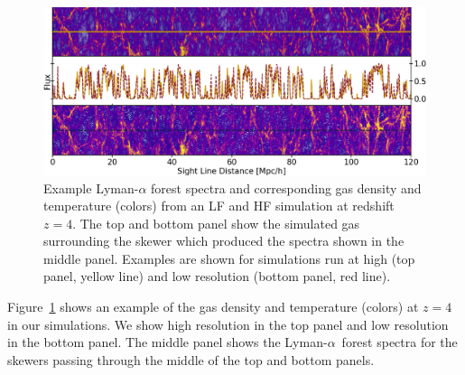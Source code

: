 \documentclass[a4paper,11pt]{article}
\newcommand{\lya}{Lyman-$\alpha$\ }
\begin{document}
\begin{figure}
    \centering
    \includegraphics[width=\columnwidth]{figures/spectra_temp_simulation.png}
    \caption{\label{fig:spec_sim}
    Example Lyman-$\alpha$ forest spectra and corresponding gas density and temperature (colors) from an LF and HF simulation at redshift $z=4$.
    The top and bottom panel show the simulated gas surrounding the skewer which produced the spectra shown in the middle panel.
    Examples are shown for simulations run at high (top panel, yellow line) and low resolution (bottom panel, red line).}
\end{figure}

Figure~\ref{fig:spec_sim} shows an example of the gas density and temperature (colors) at $z=4$ in our simulations. We show high resolution in the top panel and low resolution in the bottom panel. The middle panel shows the \lya forest spectra for the skewers passing through the middle of the top and bottom panels.
\end{document}
